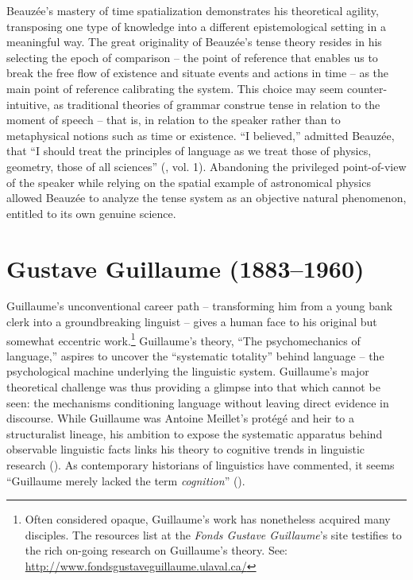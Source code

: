 \documentclass[english,output=paper,colorlinks,citecolor=brown]{../langscibook}
\begin{document}
Beauzée’s mastery of time spatialization demonstrates his theoretical agility, transposing one type of knowledge into a different epistemological setting in a meaningful way. The great originality of Beauzée’s tense theory resides in his selecting the epoch of comparison -- the point of reference that enables us to break the free flow of existence and situate events and actions in time -- as the main point of reference calibrating the system. This choice may seem counter-intuitive, as traditional theories of grammar construe tense in relation to the moment of speech -- that is, in relation to the speaker rather than to metaphysical notions such as time or existence. “I believed,” admitted Beauzée, that “I should treat the principles of language as we treat those of physics, geometry, those of all sciences” (\citeyear[xvi]{Beauzée1767}, vol. 1). Abandoning the privileged point-of-view of the speaker while relying on the spatial example of astronomical physics allowed Beauzée to analyze the tense system as an objective natural phenomenon, entitled to its own genuine science.

\section{Gustave Guillaume (1883–1960)}

Guillaume’s unconventional career path -- transforming him from a young bank clerk into a groundbreaking linguist \citep{Valin1982} -- gives a human face to his original but somewhat eccentric work.\footnote{Often considered opaque, Guillaume’s work has nonetheless acquired many disciples. The resources list at the \textit{Fonds Gustave Guillaume}’s site testifies to the rich on-going research on Guillaume’s theory. See: \url{http://www.fondsgustaveguillaume.ulaval.ca/}}  Guillaume’s theory, “The psychomechanics of language,” aspires to uncover the “systematic totality” \citep[15]{Guillaume1965Archi} behind language -- the psychological machine underlying the linguistic system. Guillaume’s major theoretical challenge was thus providing a glimpse into that which cannot be seen: the mechanisms conditioning language without leaving direct evidence in discourse. While Guillaume was Antoine Meillet’s protégé and heir to a structuralist lineage, his ambition to expose the systematic apparatus behind observable linguistic facts links his theory to cognitive trends in linguistic research (\citealt{PuechEtAl1997}). As contemporary historians of linguistics have commented, it seems “Guillaume merely lacked the term \textit{cognition}” (\citealt[41]{Bottineau2006}). 
\end{document}
